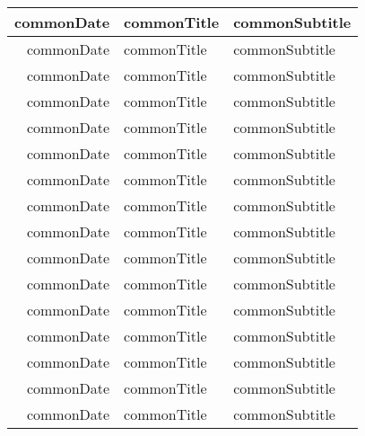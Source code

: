 \documentclass{article}
\newcommand{\dateOf}[1]{\csname commonDate#1\endcsname}
\newcommand{\titleOf}[1]{\csname commonTitle#1\endcsname}
\newcommand{\subtitleOf}[1]{\csname commonSubtitle#1\endcsname}
\begin{document}
\begin{longtable}[H]{|r|l|l|}
  \dateOf{\commonEventTwentyFour} & \titleOf{\commonEventTwentyFour} & \subtitleOf{\commonEventTwentyFour} \\ \hline
  \dateOf{\commonEventTwentyFive} & \titleOf{\commonEventTwentyFive} & \subtitleOf{\commonEventTwentyFive} \\ \hline
  \dateOf{\commonEventTwentySix} & \titleOf{\commonEventTwentySix} & \subtitleOf{\commonEventTwentySix} \\ \hline
  \dateOf{\commonEventTwentySeven} & \titleOf{\commonEventTwentySeven} & \subtitleOf{\commonEventTwentySeven} \\ \hline
  \dateOf{\commonEventTwentyEight} & \titleOf{\commonEventTwentyEight} & \subtitleOf{\commonEventTwentyEight} \\ \hline
  \dateOf{\commonEventTwentyNine} & \titleOf{\commonEventTwentyNine} & \subtitleOf{\commonEventTwentyNine} \\ \hline
  \dateOf{\commonEventThirty} & \titleOf{\commonEventThirty} & \subtitleOf{\commonEventThirty} \\ \hline
  \dateOf{\commonEventThirtyOne} & \titleOf{\commonEventThirtyOne} & \subtitleOf{\commonEventThirtyOne} \\ \hline
  \dateOf{\commonEventThirtyTwo} & \titleOf{\commonEventThirtyTwo} & \subtitleOf{\commonEventThirtyTwo} \\ \hline
  \dateOf{\commonEventThirtyThree} & \titleOf{\commonEventThirtyThree} & \subtitleOf{\commonEventThirtyThree} \\ \hline
  \dateOf{\commonEventThirtyFour} & \titleOf{\commonEventThirtyFour} & \subtitleOf{\commonEventThirtyFour} \\ \hline
  \dateOf{\commonEventThirtyFive} & \titleOf{\commonEventThirtyFive} & \subtitleOf{\commonEventThirtyFive} \\ \hline
  \dateOf{\commonEventThirtySix} & \titleOf{\commonEventThirtySix} & \subtitleOf{\commonEventThirtySix} \\ \hline
  \dateOf{\commonEventThirtySeven} & \titleOf{\commonEventThirtySeven} & \subtitleOf{\commonEventThirtySeven} \\ \hline
  \dateOf{\commonEventThirtyEight} & \titleOf{\commonEventThirtyEight} & \subtitleOf{\commonEventThirtyEight} \\ \hline
  \dateOf{\commonEventThirtyNine} & \titleOf{\commonEventThirtyNine} & \subtitleOf{\commonEventThirtyNine} \\ \hline
\end{longtable}
\end{document}
